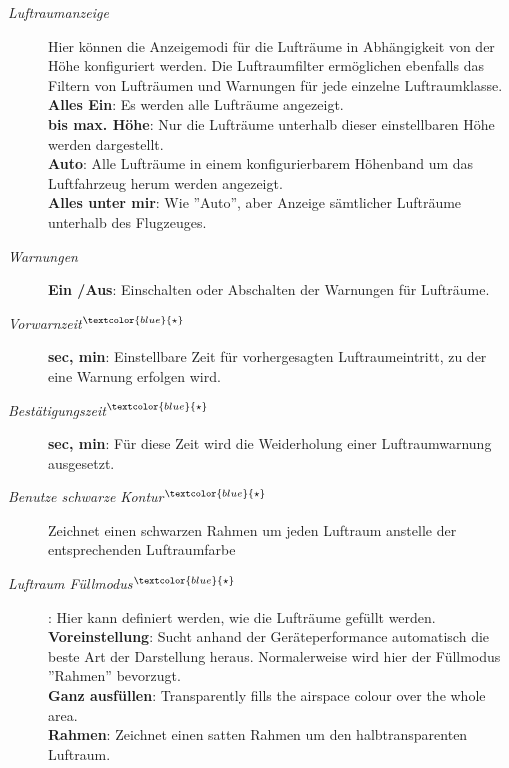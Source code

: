 \begin{description}
\item[\textit{Luftraumanzeige}]  Hier können die Anzeigemodi für die Lufträume in
Abhängigkeit von der Höhe konfiguriert werden.
Die Luftraumfilter ermöglichen ebenfalls das Filtern von Lufträumen und Warnungen für jede
 einzelne Luftraumklasse. \\
  {\bf Alles Ein}: Es werden alle Lufträume angezeigt.\\
  {\bf bis max. Höhe}: Nur die Lufträume unterhalb dieser einstellbaren Höhe werden dargestellt.\\
  {\bf Auto}: Alle Lufträume in einem konfigurierbarem Höhenband um das Luftfahrzeug herum werden angezeigt.
\\
  {\bf Alles unter mir}:  Wie ''Auto'', aber Anzeige sämtlicher Lufträume unterhalb des Flugzeuges.
\item[\textit{Warnungen}]  {\bf Ein /Aus}:  Einschalten oder Abschalten der Warnungen für Lufträume.
\item[\textit{Vorwarnzeit$^{\textcolor{blue}{\star}}$}]  {\bf sec, min}: Einstellbare Zeit für vorhergesagten Luftraumeintritt, zu der eine Warnung erfolgen wird.
\item[\textit{Bestätigungszeit$^{\textcolor{blue}{\star}}$}]  {\bf sec, min}: Für diese Zeit wird die Weiderholung einer Luftraumwarnung ausgesetzt.
\item[\textit{Benutze schwarze Kontur$^{\textcolor{blue}{\star}}$}] Zeichnet einen schwarzen Rahmen um jeden Luftraum anstelle der entsprechenden Luftraumfarbe
\item[\textit{Luftraum Füllmodus$^{\textcolor{blue}{\star}}$}]  {\bf }:  Hier kann definiert werden, wie die Lufträume gefüllt werden.\\
   {\bf Voreinstellung}: Sucht anhand der Geräteperformance automatisch die beste Art der Darstellung heraus.
    Normalerweise wird hier der Füllmodus ''Rahmen'' bevorzugt.\\
    {\bf Ganz ausfüllen}:  Transparently fills the airspace colour over the whole area. \\
    {\bf Rahmen}: Zeichnet einen satten Rahmen um den halbtransparenten Luftraum. \\
\end{description}

